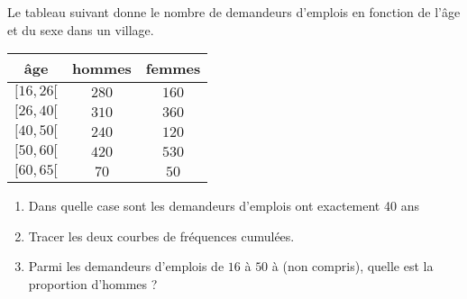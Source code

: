 
\begin{exercice}\label{exoSeconde-0034}

    Le tableau suivant donne le nombre de demandeurs d'emplois en fonction de l'âge et du sexe dans un village.

    \begin{center}
        \begin{tabular}{|c|c|c|}
            \hline
            âge&hommes&femmes\\
            \hline\hline
            \( \mathopen[ 16 , 26 [\)&\( 280\)&\( 160\)\\
                \hline
                \( \mathopen[ 26 , 40 [\)&\( 310\)&\( 360\)\\
                    \hline
            \( \mathopen[ 40 , 50 [\)&\( 240\)&\( 120\)\\
                \hline
             \( \mathopen[ 50 , 60 [\)&\( 420\)&\( 530\)\\
                 \hline
              \( \mathopen[ 60 , 65 [\)&$70$&$50$\\
                  \hline
        \end{tabular}
    \end{center}

    \begin{enumerate}
        \item
    Dans quelle case sont les demandeurs d'emplois ont exactement 40 ans 
\item 
    Tracer les deux courbes de fréquences cumulées. 
\item
    Parmi les demandeurs d'emplois de \( 16\) à \( 50\) à (non compris), quelle est la proportion d'hommes ?
            
    \end{enumerate}

\end{exercice}
